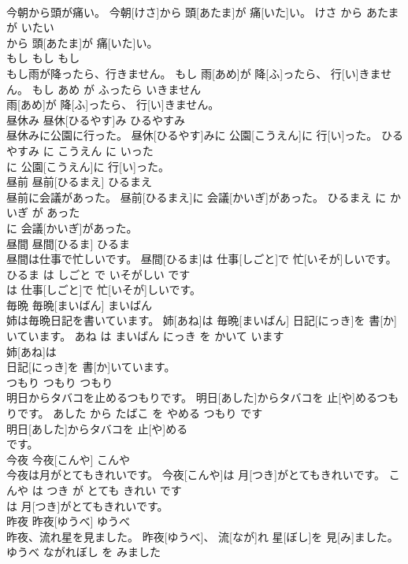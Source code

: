\documentclass[8pt]{extreport}
\begin{document}
\begin{CJK}{UTF8}{min}
\\	今朝から頭が痛い。	今朝[けさ]から 頭[あたま]が 痛[いた]い。	けさ から あたま が いたい	
\\	から 頭[あたま]が 痛[いた]い。			
\\	もし	もし	もし	
\\	もし雨が降ったら、行きません。	もし 雨[あめ]が 降[ふ]ったら、 行[い]きません。	もし あめ が ふったら いきません	
\\	雨[あめ]が 降[ふ]ったら、 行[い]きません。			
\\	昼休み	昼休[ひるやす]み	ひるやすみ	
\\	昼休みに公園に行った。	昼休[ひるやす]みに 公園[こうえん]に 行[い]った。	ひるやすみ に こうえん に いった	
\\	に 公園[こうえん]に 行[い]った。			
\\	昼前	昼前[ひるまえ]	ひるまえ	
\\	昼前に会議があった。	昼前[ひるまえ]に 会議[かいぎ]があった。	ひるまえ に かいぎ が あった	
\\	に 会議[かいぎ]があった。			
\\	昼間	昼間[ひるま]	ひるま	
\\	昼間は仕事で忙しいです。	昼間[ひるま]は 仕事[しごと]で 忙[いそが]しいです。	ひるま は しごと で いそがしい です	
\\	は 仕事[しごと]で 忙[いそが]しいです。			
\\	毎晩	毎晩[まいばん]	まいばん	
\\	姉は毎晩日記を書いています。	姉[あね]は 毎晩[まいばん] 日記[にっき]を 書[か]いています。	あね は まいばん にっき を かいて います	
\\	姉[あね]は
\\	日記[にっき]を 書[か]いています。			
\\	つもり	つもり	つもり	
\\	明日からタバコを止めるつもりです。	明日[あした]からタバコを 止[や]めるつもりです。	あした から たばこ を やめる つもり です	
\\	明日[あした]からタバコを 止[や]める
\\	です。			
\\	今夜	今夜[こんや]	こんや	
\\	今夜は月がとてもきれいです。	今夜[こんや]は 月[つき]がとてもきれいです。	こんや は つき が とても きれい です	
\\	は 月[つき]がとてもきれいです。			
\\	昨夜	昨夜[ゆうべ]	ゆうべ	
\\	昨夜、流れ星を見ました。	昨夜[ゆうべ]、 流[なが]れ 星[ぼし]を 見[み]ました。	ゆうべ ながれぼし を みました	

\end{CJK}
\end{document}
